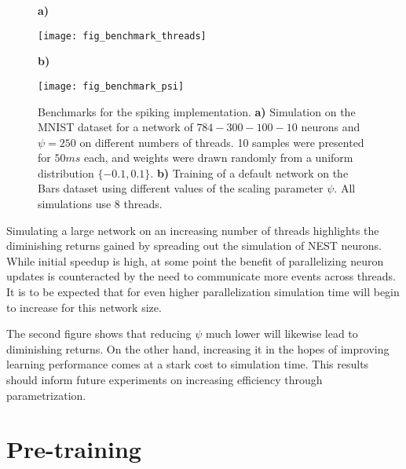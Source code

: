 \begin{figure}[h]
    \centering
    \begin{minipage}{0.5\textwidth}
        \textbf{a)}\par\medskip
        \centering
        \texttt{[image: fig\_benchmark\_threads]}
    \end{minipage}\hfill
    \begin{minipage}{0.5\textwidth}
        \textbf{b)}\par\medskip
        \centering
        \texttt{[image: fig\_benchmark\_psi]}
    \end{minipage}
    \caption[Benchmarks for the spiking implementation]{Benchmarks for the spiking implementation. \textbf{a)}
        Simulation on the MNIST dataset for a network of $784-300-100-10$ neurons and $\psi=250$ on different numbers of
        threads. 10 samples were presented for $50ms$ each, and weights were drawn randomly from a uniform distribution
        $ \{-0.1, 0.1\}$. \textbf{b)} Training of a default network on the Bars dataset using different values of
        the scaling parameter $\psi$. All simulations use 8 threads.}
    \label{fig-benchmark-threads-psi}
\end{figure}

Simulating a large network on an increasing number of threads highlights the diminishing returns gained by spreading out
the simulation of NEST neurons. While initial speedup is high, at some point the benefit of parallelizing neuron updates
is counteracted by the need to communicate more events across threads. It is to be expected that for even higher
parallelization simulation time will begin to increase for this network size.

The second figure shows that reducing $\psi$ much lower will likewise lead to diminishing returns. On the other hand,
increasing it in the hopes of improving learning performance comes at a stark cost to simulation time. This results
should inform future experiments on increasing efficiency through parametrization.

\section{Pre-training}

